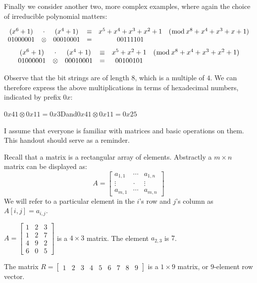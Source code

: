 Finally we consider another two, more complex examples, where again the choice
of irreducible polynomial matters:

\example \[\begin{array}{cccccccr}
(x^6+1) &\cdot & (x^4+1) & \equiv & x^5+x^4+x^3+x^2+1&({\bmod}\, x^8+x^4+x^3+x+1)\\
01000001 & \otimes & 00010001 & = & 00111101
\end{array}\]
\[\begin{array}{cccccccr}
(x^6+1) &\cdot & (x^4+1) & \equiv & x^5+x^2+1 &({\bmod}\, x^8+x^4+x^3+x^2+1)\\
01000001 & \otimes & 00010001 & = & 00100101
\end{array}\]

Observe that the bit strings are of length $8$, which is a multiple of $4$. We
can therefore express the above multiplications in terms of hexadecimal numbers,
indicated by prefix $0x$:

\centerline{$0x41 \otimes 0x11 = 0x3\mathrm{D}$\qquad and\qquad $0x41 \otimes 0x11 = 0x25$}

\endMaths\fi

\ifMaths
{}

I assume that everyone is familiar with matrices and basic operations on them.
This handout should serve as a reminder.

Recall that a matrix is a rectangular array of elements. Abstractly a $m\times
n$ matrix can be displayed as:
\[A=\begin{bmatrix}
  a_{1,1}  & \cdots  & a_{1,n}\\
  \vdots & \cdot & \vdots \\
  a_{m,1} & \cdots & a_{m,n}
\end{bmatrix}\]
We will refer to a particular element in the $i$'s row and $j$'s column as $A[i,j]=a_{i,j}$.

\example $A = \begin{bmatrix} 1 & 2 & 3 \\ 1 & 2 & 7 \\ 4&9&2 \\
  6&0&5\end{bmatrix}$ is a $4\times3$ matrix. The element $a_{2,3}$ is $7$.

The matrix $R = \begin{bmatrix} 1 & 2 & 3 & 4 & 5 & 6 & 7 & 8 & 9 \end{bmatrix}$
is a $1\times 9$ matrix, or 9-element row vector.\vspace{.5cm}

